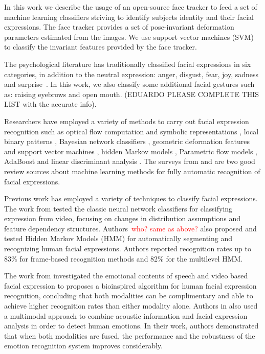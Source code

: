 \documentclass[]{article}
\begin{document}
In this work we describe the usage of an open-source face tracker to feed a set of machine learning classifiers striving
to identify subjects identity and their facial expressions. The face
tracker provides a set of pose-invariant deformation parameters
estimated from the images. We use support vector machines (SVM)
to classify the invariant features provided by the face tracker.


The psychological literature has traditionally classified facial
expressions in six categories, in addition to the neutral expression:
anger, disgust, fear, joy, sadness and
surprise~\cite{schmidt2002human}. In this work, we also classify some additional facial gestures such as: raising eyebrows and open mouth.
(EDUARDO PLEASE COMPLETE THIS LIST with the accurate info).


Researchers have employed a variety of methods to carry out facial expression recognition such as optical flow
computation  and symbolic representations \cite{Yacoob506414}, local binary patterns \cite{Shan2009803},  Bayesian
network classifiers \cite{Cohen1211408}, geometric deformation features and support vector machines
\cite{kotsia4032815}, hidden Markov models \cite{aleksic1597130, Cohen2003160}, Parametric flow models
\cite{blackAndYacoob}, AdaBoost and linear discriminant analysis \cite{bartlett1398364}. The surveys from
\cite{bartlett1398364} and \cite{Fasel2003259} are two good review sources about machine learning methods 
for fully automatic recognition of facial expressions. 


Previous work has employed a variety of techniques to classify  facial expressions. The work from \cite{Cohen2003160}
tested the classic neural network classifiers for classifying expression from video, focusing on changes in distribution
assumptions and feature dependency
structures. Authors~\textcolor{red}{who? same as above?} also proposed
and tested Hidden Markov Models (HMM) for automatically segmenting and
recognizing human facial expressions. Authors reported recognition
rates up to 83\% for frame-based recognition methods and 82\% for the
multilevel HMM. 


The work from \cite{Chen670976} investigated the emotional contents of speech and video based facial expression to
proposes a bioinspired algorithm for human facial expression recognition, concluding that both modalities can be
complimentary and able to achieve higher recognition rates than either modality alone. Authors in \cite{Busso:2004} also
used a multimodal approach to combine acoustic information and facial expression analysis in order to detect human
emotions. In their work, authors demonstrated that when both modalities are fused, the performance and the robustness of
the emotion recognition system improves considerably.
\end{document}
